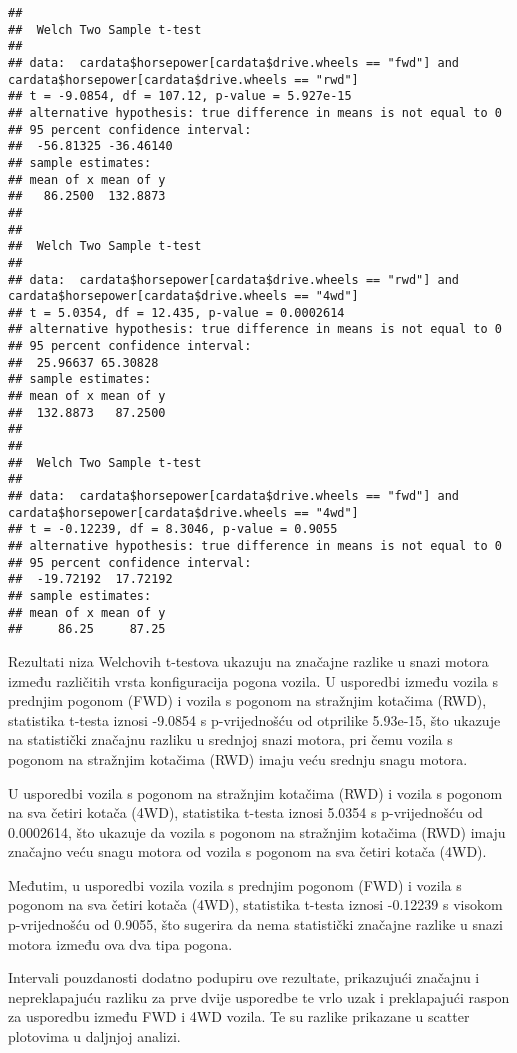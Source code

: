 \documentclass[
]{article}
\begin{document}
\begin{verbatim}
## 
##  Welch Two Sample t-test
## 
## data:  cardata$horsepower[cardata$drive.wheels == "fwd"] and cardata$horsepower[cardata$drive.wheels == "rwd"]
## t = -9.0854, df = 107.12, p-value = 5.927e-15
## alternative hypothesis: true difference in means is not equal to 0
## 95 percent confidence interval:
##  -56.81325 -36.46140
## sample estimates:
## mean of x mean of y 
##   86.2500  132.8873 
## 
## 
##  Welch Two Sample t-test
## 
## data:  cardata$horsepower[cardata$drive.wheels == "rwd"] and cardata$horsepower[cardata$drive.wheels == "4wd"]
## t = 5.0354, df = 12.435, p-value = 0.0002614
## alternative hypothesis: true difference in means is not equal to 0
## 95 percent confidence interval:
##  25.96637 65.30828
## sample estimates:
## mean of x mean of y 
##  132.8873   87.2500 
## 
## 
##  Welch Two Sample t-test
## 
## data:  cardata$horsepower[cardata$drive.wheels == "fwd"] and cardata$horsepower[cardata$drive.wheels == "4wd"]
## t = -0.12239, df = 8.3046, p-value = 0.9055
## alternative hypothesis: true difference in means is not equal to 0
## 95 percent confidence interval:
##  -19.72192  17.72192
## sample estimates:
## mean of x mean of y 
##     86.25     87.25
\end{verbatim}

Rezultati niza Welchovih t-testova ukazuju na značajne razlike u snazi
motora između različitih vrsta konfiguracija pogona vozila. U usporedbi
između vozila s prednjim pogonom (FWD) i vozila s pogonom na stražnjim
kotačima (RWD), statistika t-testa iznosi -9.0854 s p-vrijednošću od
otprilike 5.93e-15, što ukazuje na statistički značajnu razliku u
srednjoj snazi motora, pri čemu vozila s pogonom na stražnjim kotačima
(RWD) imaju veću srednju snagu motora.

U usporedbi vozila s pogonom na stražnjim kotačima (RWD) i vozila s
pogonom na sva četiri kotača (4WD), statistika t-testa iznosi 5.0354 s
p-vrijednošću od 0.0002614, što ukazuje da vozila s pogonom na stražnjim
kotačima (RWD) imaju značajno veću snagu motora od vozila s pogonom na
sva četiri kotača (4WD).

Međutim, u usporedbi vozila vozila s prednjim pogonom (FWD) i vozila s
pogonom na sva četiri kotača (4WD), statistika t-testa iznosi -0.12239 s
visokom p-vrijednošću od 0.9055, što sugerira da nema statistički
značajne razlike u snazi motora između ova dva tipa pogona.

Intervali pouzdanosti dodatno podupiru ove rezultate, prikazujući
značajnu i nepreklapajuću razliku za prve dvije usporedbe te vrlo uzak i
preklapajući raspon za usporedbu između FWD i 4WD vozila. Te su razlike
prikazane u scatter plotovima u daljnjoj analizi.
\end{document}
